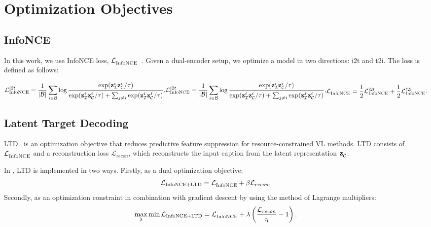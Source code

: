 
\section{Optimization Objectives}\label{app:losses}

\subsection{InfoNCE}\label{app:info}
In this work, we use InfoNCE loss, $\mathcal{L}_{\text{InfoNCE}}^{}$~\citep{oord2018representation}.
Given a dual-encoder setup, we optimize a model in two directions: \acf{i2t} and \acf{t2i}.
The loss is defined as follows: 

\begin{subequations}
\begin{align*}
	\infonce{i2t} = \frac{1}{|\mathcal{B}|} \sum_{i \in \mathcal{B}}^{}\log \frac{
		\exp(\zimg{i}{}\zcapt{i}{}/\tau)
	}
	{\exp(\zimg{i}{}\zcapt{i}{}/\tau) + \sum_{j \neq i }^{} \exp(\zimg{i}{}\zcapt{j}{}/\tau)}, 
\end{align*}
\begin{align*}
	\infonce{i2t} = \frac{1}{|\mathcal{B}|} \sum_{i \in \mathcal{B}}^{}\log \frac{
		\exp(\zimg{i}{}\zcapt{i}{}/\tau)
	}
	{\exp(\zimg{i}{}\zcapt{i}{}/\tau) + \sum_{j \neq i }^{} \exp(\zimg{j}{}\zcapt{i}{}/\tau)}, 
\end{align*}
\begin{align*}
 	\infonce{} =  \frac{1}{2}  	\infonce{i2t} +  \frac{1}{2}  	\infonce{t2i}.
\end{align*}
\end{subequations}


\subsection{Latent Target Decoding}\label{app:ltd}

\Acf{LTD}~\citep{bleeker2023reducing} is an optimization objective that reduces predictive feature suppression for resource-constrained \ac{VL} methods.
\ac{LTD} consists of $\mathcal{L}_{\text{InfoNCE}}^{}$ and a reconstruction loss $ \mathcal{L}_{recon}$, which reconstructs the input caption from the latent representation $\mathbf{z}_{\mathcal{C}_{}}^{}$.

In \citep{bleeker2023reducing}, \ac{LTD} is implemented in two ways. 
Firstly, as a dual optimization objective:
\begin{align*}
	\mathcal{L}_{\text{InfoNCE+LTD}} = \mathcal{L}_{\text{InfoNCE}}^{} + \beta \mathcal{L}_{recon}.
\end{align*}
Secondly, as an optimization constraint in combination with gradient descent by using the method of Lagrange multipliers:
\begin{align*}
	\max_{\lambda} \min_{}  \mathcal{L}_{\text{InfoNCE+LTD}}=  \mathcal{L}_{\text{InfoNCE}}^{}  + \lambda \left( \frac{\mathcal{L}_{recon}}{\eta} - 1 \right).
\end{align*}

